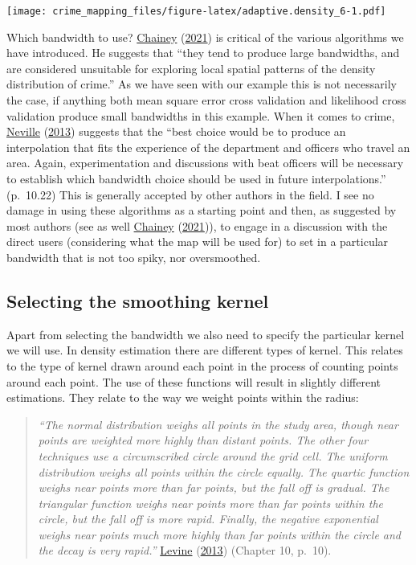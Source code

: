 \documentclass[
  krantz2]{krantz}
\begin{document}
\texttt{[image: crime\_mapping\_files/figure-latex/adaptive.density\_6-1.pdf]}

Which bandwidth to use? \protect\hyperlink{ref-Chainey_2021}{Chainey} (\protect\hyperlink{ref-Chainey_2021}{2021}) is critical of the various algorithms we have introduced. He suggests that ``they tend to produce large bandwidths, and are considered unsuitable for exploring local spatial patterns of the density distribution of crime.'' As we have seen with our example this is not necessarily the case, if anything both mean square error cross validation and likelihood cross validation produce small bandwidths in this example. When it comes to crime, \protect\hyperlink{ref-Neville_2013}{Neville} (\protect\hyperlink{ref-Neville_2013}{2013}) suggests that the ``best choice would be to produce an interpolation that fits the experience of the department and officers who travel an area. Again, experimentation and discussions with beat officers will be necessary to establish which bandwidth choice should be used in future interpolations.'' (p.~10.22) This is generally accepted by other authors in the field. I see no damage in using these algorithms as a starting point and then, as suggested by most authors (see as well \protect\hyperlink{ref-Chainey_2021}{Chainey} (\protect\hyperlink{ref-Chainey_2021}{2021})), to engage in a discussion with the direct users (considering what the map will be used for) to set in a particular bandwidth that is not too spiky, nor oversmoothed.

\hypertarget{selecting-the-smoothing-kernel}{%
\subsection{Selecting the smoothing kernel}\label{selecting-the-smoothing-kernel}}

Apart from selecting the bandwidth we also need to specify the particular kernel we will use. In density estimation there are different types of kernel. This relates to the type of kernel drawn around each point in the process of counting points around each point. The use of these functions will result in slightly different estimations. They relate to the way we weight points within the radius:

\begin{quote}
\emph{``The normal distribution weighs all points in the study area, though near points are weighted more highly than distant points. The other four techniques use a circumscribed circle around the grid cell. The uniform distribution weighs all points within the circle equally. The quartic function weighs near points more than far points, but the fall off is gradual. The triangular function weighs near points more than far points within the circle, but the fall off is more rapid. Finally, the negative exponential weighs near points much more highly than far points within the circle and the decay is very rapid.''} \protect\hyperlink{ref-Levine_2013}{Levine} (\protect\hyperlink{ref-Levine_2013}{2013}) (Chapter 10, p.~10).
\end{quote}
\end{document}
